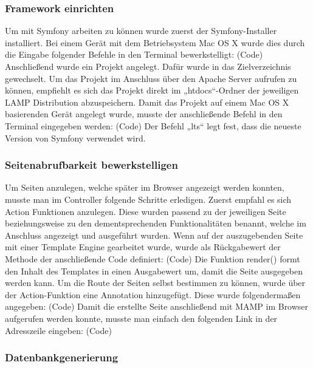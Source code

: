     \subsubsection{Framework einrichten}

Um mit Symfony arbeiten zu können wurde zuerst der Symfony-Installer installiert. Bei einem Gerät mit dem Betriebsystem Mac OS X wurde dies durch die Eingabe folgender Befehle in den Terminal bewerkstelligt:
(Code)
Anschließend wurde ein Projekt angelegt. Dafür wurde in das Zielverzeichnis gewechselt. Um das Projekt im Anschluss über den Apache Server aufrufen zu können, empfiehlt es sich das Projekt direkt im „htdocs“-Ordner der jeweiligen LAMP Distribution abzuspeichern. Damit das Projekt auf einem Mac OS X basierenden Gerät angelegt wurde, musste der anschließende Befehl in den Terminal eingegeben werden:
(Code)
Der Befehl „lts“ legt fest, dass die neueste Version von Symfony verwendet wird.

    \subsubsection{Seitenabrufbarkeit bewerkstelligen}

Um Seiten anzulegen, welche später im Browser angezeigt werden konnten, musste man im Controller folgende Schritte erledigen. Zuerst empfahl es sich Action Funktionen anzulegen. Diese wurden passend zu der jeweiligen Seite beziehungsweise zu den dementsprechenden Funktionalitäten benannt, welche im Anschluss angezeigt und ausgeführt wurden. Wenn auf der auszugebenden Seite mit einer Template Engine gearbeitet wurde, wurde als Rückgabewert der Methode der anschließende Code definiert:
(Code)
Die Funktion render() formt den Inhalt des Templates in einen Ausgabewert um, damit die Seite  ausgegeben werden kann.
Um die Route der Seiten selbst bestimmen zu können, wurde über der Action-Funktion eine Annotation hinzugefügt. Diese wurde folgendermaßen angegeben:
(Code)
Damit die erstellte Seite anschließend mit MAMP im Browser aufgerufen werden konnte, musste man einfach den folgenden Link in der Adresszeile eingeben:
(Code)


    \subsubsection{Datenbankgenerierung}

